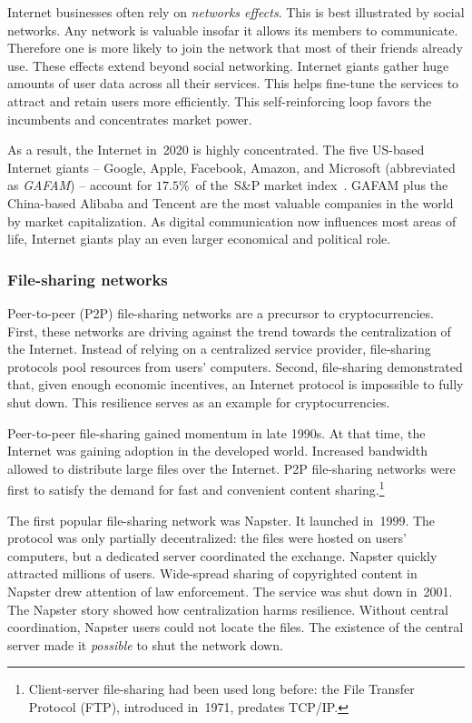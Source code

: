 Internet businesses often rely on \textit{networks effects}.
This is best illustrated by social networks.
Any network is valuable insofar it allows its members to communicate.
Therefore one is more likely to join the network that most of their friends already use.
These effects extend beyond social networking.
Internet giants gather huge amounts of user data across all their services.
This helps fine-tune the services to attract and retain users more efficiently.
This self-reinforcing loop favors the incumbents and concentrates market power.

As a result, the Internet in~2020 is highly concentrated.
The five US-based Internet giants -- Google, Apple, Facebook, Amazon, and Microsoft (abbreviated as \textit{GAFAM}) -- account for $17.5\%$~of the~S\&P market index~\cite{Levy2020}.
GAFAM plus the China-based Alibaba and Tencent are the most valuable companies in the world by market capitalization.
As digital communication now influences most areas of life, Internet giants play an even larger economical and political role.


\subsubsection*{File-sharing networks}
\label{sec:FileSharingNetworks}

Peer-to-peer (P2P) file-sharing networks are a precursor to cryptocurrencies.
First, these networks are driving against the trend towards the centralization of the Internet.
Instead of relying on a centralized service provider, file-sharing protocols pool resources from users' computers.
Second, file-sharing demonstrated that, given enough economic incentives, an Internet protocol is impossible to fully shut down.
This resilience serves as an example for cryptocurrencies.

Peer-to-peer file-sharing gained momentum in late 1990s.
At that time, the Internet was gaining adoption in the developed world.
Increased bandwidth allowed to distribute large files over the Internet.
P2P file-sharing networks were first to satisfy the demand for fast and convenient content sharing.\footnote{Client-server file-sharing had been used long before: the File Transfer Protocol (FTP), introduced in~1971,  predates TCP/IP.}

The first popular file-sharing network was Napster.
It launched in~1999.
The protocol was only partially decentralized: the files were hosted on users' computers, but a dedicated server coordinated the exchange.
Napster quickly attracted millions of users.
Wide-spread sharing of copyrighted content in Napster drew attention of law enforcement.
The service was shut down in~2001.
The Napster story showed how centralization harms resilience.
Without central coordination, Napster users could not locate the files.
The existence of the central server made it \textit{possible} to shut the network down.

